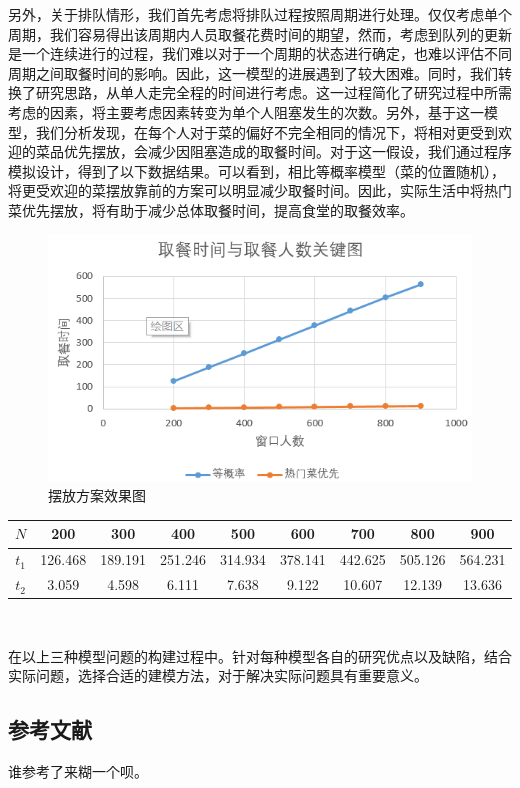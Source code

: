 \documentclass[lang=cn,10pt,a4paper]{elegantpaper}
\begin{document}
另外，关于排队情形，我们首先考虑将排队过程按照周期进行处理。仅仅考虑单个周期，我们容易得出该周期内人员取餐花费时间的期望，然而，考虑到队列的更新是一个连续进行的过程，我们难以对于一个周期的状态进行确定，也难以评估不同周期之间取餐时间的影响。因此，这一模型的进展遇到了较大困难。同时，我们转换了研究思路，从单人走完全程的时间进行考虑。这一过程简化了研究过程中所需考虑的因素，将主要考虑因素转变为单个人阻塞发生的次数。另外，基于这一模型，我们分析发现，在每个人对于菜的偏好不完全相同的情况下，将相对更受到欢迎的菜品优先摆放，会减少因阻塞造成的取餐时间。对于这一假设，我们通过程序模拟设计，得到了以下数据结果。可以看到，相比等概率模型（菜的位置随机），将更受欢迎的菜摆放靠前的方案可以明显减少取餐时间。因此，实际生活中将热门菜优先摆放，将有助于减少总体取餐时间，提高食堂的取餐效率。
\begin{figure}[htbp]
  \centering
  \includegraphics[scale=1]{./image/pic2.png}
  \caption{摆放方案效果图}
\end{figure}
\begin{center}
\begin{tabular}{|c|c|c|c|c|c|c|c|c|}
\hline
$N$&200&300&400&500&600&700&800&900\\
\hline
$t_1$&126.468&189.191&251.246&314.934&378.141&442.625&505.126&564.231\\
\hline
$t_2$&3.059&4.598&6.111&7.638&9.122&10.607&12.139&13.636\\
\hline
\end{tabular}\\
\end{center}


在以上三种模型问题的构建过程中。针对每种模型各自的研究优点以及缺陷，结合实际问题，选择合适的建模方法，对于解决实际问题具有重要意义。
\subsection{参考文献}
谁参考了来糊一个呗。
\end{document}
